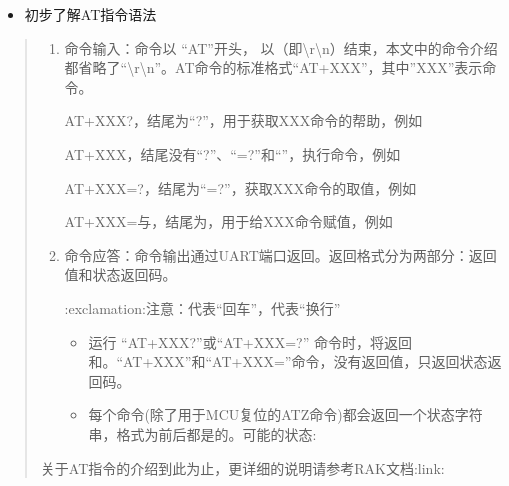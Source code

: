 \documentclass[a4paper,12pt,english]{sphinxmanual}
\begin{document}
{{\begin{itemize}
\item {} 
\sphinxAtStartPar
初步了解AT指令语法

\end{itemize}
\begin{quote}
\begin{enumerate}
%
\item {} 
\sphinxAtStartPar
命令输入：命令以 “AT”开头， 以（即\textbackslash{}r\textbackslash{}n）结束，本文中的命令介绍都省略了“\textbackslash{}r\textbackslash{}n”。AT命令的标准格式“AT+XXX”，其中”XXX”表示命令。

\sphinxAtStartPar
{}

\sphinxAtStartPar
AT+XXX?，结尾为“?”，用于获取XXX命令的帮助，例如

\sphinxAtStartPar
AT+XXX，结尾没有“?”、“=?”和“”，执行命令，例如

\sphinxAtStartPar
AT+XXX=?，结尾为“=?”，获取XXX命令的取值，例如

\sphinxAtStartPar
AT+XXX=与，结尾为，用于给XXX命令赋值，例如

\item {} 
\sphinxAtStartPar
命令应答：命令输出通过UART端口返回。返回格式分为两部分：返回值和状态返回码。

\sphinxAtStartPar


\sphinxAtStartPar


\sphinxAtStartPar
:exclamation:注意：代表“回车”，代表“换行”
\begin{itemize}
\item {} 
\sphinxAtStartPar
运行 “AT+XXX?”或“AT+XXX=?” 命令时，将返回和。“AT+XXX”和“AT+XXX=”命令，没有返回值，只返回状态返回码。

\item {} 
\sphinxAtStartPar
每个命令(除了用于MCU复位的ATZ命令)都会返回一个状态字符串，格式为前后都是的。可能的状态:

\end{itemize}

\sphinxAtStartPar
{}

\end{enumerate}

\sphinxAtStartPar
关于AT指令的介绍到此为止，更详细的说明请参考RAK文档:link: 
\end{quote}


}}
\end{document}
